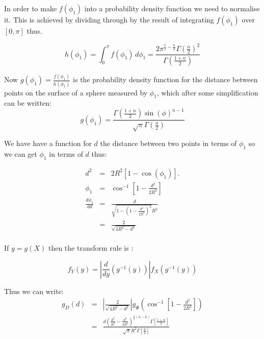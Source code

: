  In order to make  $f(\phi_1)$ into a probability density function we need to normalise it. This is achieved by dividing through by the result of integrating $f(\phi_1)$ over $[0, \pi]$ thus. 

 \begin{equation}      
 h(\phi_1) = \int_0^{\pi}  f(\phi_1) \, d\phi_1 =  \frac{2 \pi ^{\frac{5}{2}-\frac{n}{2}} \Gamma\left(\frac{n}{2}\right)^2}{\Gamma\left(\frac{1+n}{2}\right)}
\end{equation}


Now $g(\phi_1) =\frac{f(\phi_1)}{ h(\phi_1)}$ is the  probability density function for the distance between points on the surface of a sphere measured by $\phi_1$, which after some simplification can be written:
\begin{equation}  
 g(\phi_1) = \frac{\Gamma\left(\frac{1+n}{2}\right) \sin(\phi )^{n - 1}}{\sqrt{\pi } \Gamma\left(\frac{n}{2}\right)}
\end{equation} 

 
We have have a function for $d$ the distance between two points in terms of $\phi_1$ so we can get  $\phi_1$ in terms of $d$ thus:

\begin{eqnarray}
  d^2 & = & 2 R^2 \left[ 1 - \cos(\phi_1) \right].\\
\phi_1& =  & \cos^{-1} \left[1-\frac{d^2}{2 R^2}\right]\\ 
   \frac {d \phi_1}{dd} & = &\frac{d}{\sqrt{1-\left(1-\frac{d^2}{2 R^2}\right)^2} R^2} \\
   & = &\frac{2}{\sqrt{4 R^2 -d^2 }}\\
\end{eqnarray}


If $y = g(X)$ then the transform rule  is :  

\[ f_Y(y) = \left| \frac{d}{dy} \left( g^{-1}(y) \right) \right|
                f_X\left( g^{-1}(y) \right)
\]

Thus we can write:
\begin{eqnarray}
  g_D(d) & = & \left|\frac{2}{\sqrt{4 R^2 -d^2 }} \right| g_{\Phi}\left( \cos^{-1} \left[1-\frac{d^2}{2 R^2}\right]\right)\\
  \label{eq:nsphere_pdf_phi}
             & = &\frac{d \left(\frac{d^2}{R^2} -\frac{d^4}{4 R^4}\right)^{\frac{1}{2} (n-2)} \Gamma\left[\frac{1+n}{2}\right]}{\sqrt{\pi } R^2 \Gamma\left[\frac{n}{2}\right]} 
\end{eqnarray}




